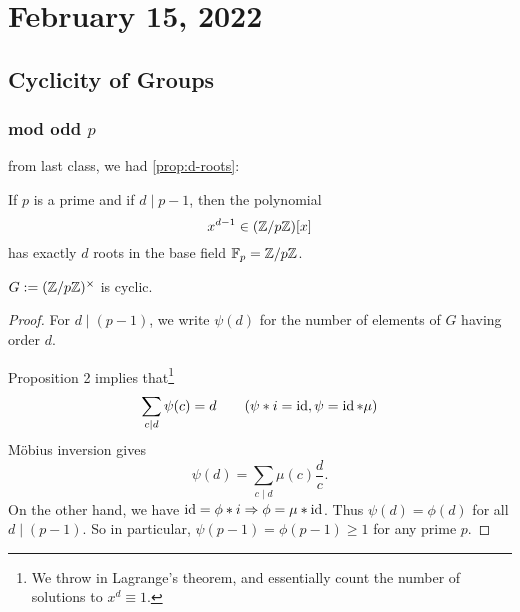 \section{February 15, 2022}

\subsection{Cyclicity of Groups}
\subsubsection{mod odd \texorpdfstring{$p$}{p}}
\recall from last class, we had \cref{prop:d-roots}:
\begin{proposition*}
    If $p$ is a prime and if $d\mid p-1$, then the polynomial
    \[x^{d-1}\in (\mathbb Z/p\mathbb Z)[x]\] has exactly $d$ roots in the base field $\mathbb F_p = \mathbb Z/p\mathbb Z$.
\end{proposition*}
\begin{corollary}\label{cor:generators-in-p}
    $G:=(\mathbb Z/p\mathbb Z)^\times$ is cyclic.
\end{corollary}
\begin{proof}
    For $d\mid (p-1)$, we write $\psi(d)$ for the number of elements of $G$ having order $d$.

    Proposition 2 implies that\footnote{We throw in Lagrange's theorem, and essentially count the number of solutions to $x^d\equiv 1$.}
    \[\sum_{c\mid d}\psi(c) = d\qquad(\psi* i = \operatorname{id}, \psi = \operatorname{id} * \mu)\]
    M\"obius inversion gives
    \[\psi(d) = \sum_{c\mid d}\mu(c)\frac{d}{c}.\]
    On the other hand, we have $\operatorname{id} = \phi * i\Rightarrow \phi = \mu * \operatorname{id}$. Thus $\psi(d) = \phi(d)$ for all $d\mid (p-1)$.
    So in particular, $\psi(p-1) = \phi(p-1)\geq 1$ for any prime $p$.
\end{proof}

